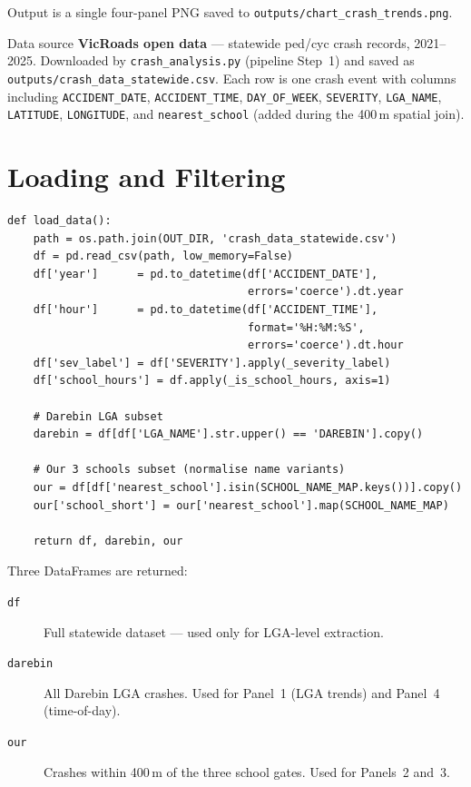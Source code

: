 \documentclass[11pt,a4paper,openany]{book}
\begin{document}
Output is a single four-panel PNG saved to \texttt{outputs/chart\_crash\_trends.png}.

\begin{keybox}{Data source}
\textbf{VicRoads open data} --- statewide ped/cyc crash records, 2021--2025.
Downloaded by \texttt{crash\_analysis.py} (pipeline Step~1) and saved as
\texttt{outputs/crash\_data\_statewide.csv}.
Each row is one crash event with columns including \texttt{ACCIDENT\_DATE},
\texttt{ACCIDENT\_TIME}, \texttt{DAY\_OF\_WEEK}, \texttt{SEVERITY},
\texttt{LGA\_NAME}, \texttt{LATITUDE}, \texttt{LONGITUDE}, and
\texttt{nearest\_school} (added during the 400\,m spatial join).
\end{keybox}

\section{Loading and Filtering}

\begin{lstlisting}[style=python, caption={load\_data() in crash\_trend\_analysis.py}]
def load_data():
    path = os.path.join(OUT_DIR, 'crash_data_statewide.csv')
    df = pd.read_csv(path, low_memory=False)
    df['year']      = pd.to_datetime(df['ACCIDENT_DATE'],
                                     errors='coerce').dt.year
    df['hour']      = pd.to_datetime(df['ACCIDENT_TIME'],
                                     format='%H:%M:%S',
                                     errors='coerce').dt.hour
    df['sev_label'] = df['SEVERITY'].apply(_severity_label)
    df['school_hours'] = df.apply(_is_school_hours, axis=1)

    # Darebin LGA subset
    darebin = df[df['LGA_NAME'].str.upper() == 'DAREBIN'].copy()

    # Our 3 schools subset (normalise name variants)
    our = df[df['nearest_school'].isin(SCHOOL_NAME_MAP.keys())].copy()
    our['school_short'] = our['nearest_school'].map(SCHOOL_NAME_MAP)

    return df, darebin, our
\end{lstlisting}

Three DataFrames are returned:

\begin{description}
  \item[\texttt{df}] Full statewide dataset --- used only for LGA-level extraction.
  \item[\texttt{darebin}] All Darebin LGA crashes. Used for Panel~1 (LGA trends) and Panel~4 (time-of-day).
  \item[\texttt{our}] Crashes within 400\,m of the three school gates. Used for Panels~2 and~3.
\end{description}
\end{document}
